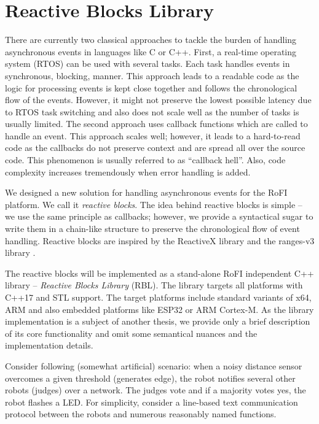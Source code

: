\section{Reactive Blocks Library} \label{sec:rbl}

There are currently two classical approaches to tackle the burden of handling
asynchronous events in languages like C or C++. First, a real-time operating
system (RTOS) can be used with several tasks. Each task handles events in
synchronous, blocking, manner. This approach leads to a readable code as the
logic for processing events is kept close together and follows the chronological
flow of the events. However, it might not preserve the lowest possible latency
due to RTOS task switching and also does not scale well as the number of tasks
is usually limited. The second approach uses callback functions which are called
to handle an event. This approach scales well; however, it leads to a
hard-to-read code as the callbacks do not preserve context and are spread all
over the source code. This phenomenon is usually referred to as ``callback
hell''. Also, code complexity increases tremendously when error handling is
added.

We designed a new solution for handling asynchronous events for the RoFI
platform. We call it \emph{reactive blocks}. The idea behind reactive blocks is
simple -- we use the same principle as callbacks; however, we provide a
syntactical sugar to write them in a chain-like structure to preserve the
chronological flow of event handling. Reactive blocks are inspired by the
ReactiveX library \cite{noauthor_reactivex_nodate} and the ranges-v3 library
\cite{noauthor_range-v3_nodate}.

The reactive blocks will be implemented as a stand-alone RoFI independent C++
library -- \emph{Reactive Blocks Library} (RBL). The library targets all
platforms with C++17 and STL support. The target platforms include standard
variants of x64, ARM and also embedded platforms like ESP32 or ARM Cortex-M. As
the library implementation is a subject of another thesis, we provide only a
brief description of its core functionality and omit some semantical nuances and
the implementation details.

Consider following (somewhat artificial) scenario: when a noisy distance sensor
overcomes a given threshold (generates edge), the robot notifies several other
robots (judges) over a network. The judges vote and if a majority votes yes, the
robot flashes a LED. For simplicity, consider a line-based text communication
protocol between the robots and numerous reasonably named functions.

